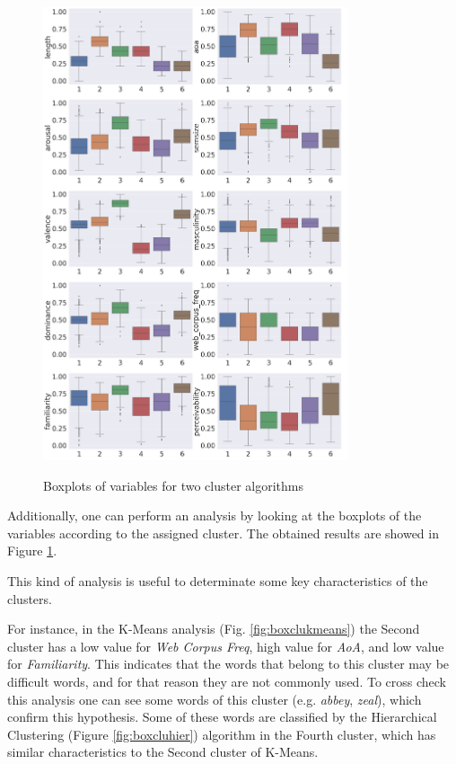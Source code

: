 \documentclass[a4paper,11pt,dvipsnames]{article}
\begin{document}
\begin{figure}[h]
\begin{minipage}{0.47\linewidth}
            \includegraphics[width=0.8\textwidth]{hierarchical-box2.png}
            \label{fig:boxcluhier}
    \end{minipage}
        \caption{Boxplots of variables for two cluster algorithms}
    \label{fig:boxcluster}
\end{figure}


Additionally, one can perform an analysis by looking at the boxplots of the variables according to the assigned cluster. The obtained results are showed in Figure \ref{fig:boxcluster}.


This kind of analysis is useful to determinate some key characteristics of the clusters. 

For instance, in the K-Means analysis (Fig. \ref{fig:boxclukmeans}) the Second cluster has a low value for \textit{Web Corpus Freq}, high value for \textit{AoA}, and low value for \textit{Familiarity}. This indicates that the words that belong to this cluster may be difficult words, and for that reason they are not commonly used. To cross check this analysis one can see some words of this cluster (e.g. \textit{abbey}, \textit{zeal}), which confirm this hypothesis.
Some of these words are classified by the Hierarchical Clustering (Figure \ref{fig:boxcluhier}) algorithm in the Fourth cluster, which has similar characteristics to the Second cluster of K-Means.
\end{document}
